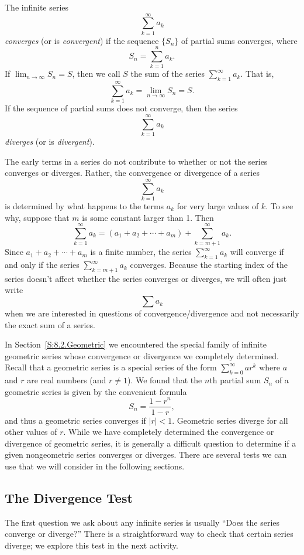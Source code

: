 \begin{definition} The infinite series
\[\sum_{k=1}^{\infty} a_k\]
\emph{converges} (or is \emph{convergent}) if the sequence $\{S_n\}$ of partial sums converges, where
\[S_n = \sum_{k=1}^n a_k.\]
If $\lim_{n \to \infty} S_n = S$, then we call $S$ the sum of the series $\sum_{k=1}^{\infty} a_k$.  That is,
\[\sum_{k=1}^{\infty} a_k = \lim_{n \to \infty} S_n = S.\]
If the sequence of partial sums does not converge, then the series
\[\sum_{k=1}^{\infty} a_k\]
\emph{diverges} (or is \emph{divergent}).
\end{definition}

The early terms in a series do not contribute to whether or not the series converges or diverges. Rather, the convergence or divergence of a series
\[\sum_{k=1}^{\infty} a_k\]
is determined by what happens to the terms $a_k$ for very large values of $k$. To see why, suppose that  $m$ is some constant larger than 1.  Then
\[\sum_{k=1}^{\infty} a_k = (a_1+a_2+ \cdots + a_m) + \sum_{k=m+1}^{\infty} a_k.\]
Since $a_1+a_2+ \cdots + a_m$ is a finite number, the series $\sum_{k=1}^{\infty} a_k$ will converge if and only if the series $\sum_{k=m+1}^{\infty} a_k$ converges. Because the starting index of the series doesn't affect whether the series converges or diverges, we will often just write
\[\sum a_k\]
when we are interested in questions of convergence/divergence and not necessarily the exact sum of a series.

In Section~\ref{S:8.2.Geometric} we encountered the special family of infinite geometric series whose convergence or divergence we completely determined. Recall that a geometric series is a special series of the form $\sum_{k=0}^{\infty} ar^k$ where $a$ and $r$ are real numbers (and $r \ne 1$). We found that the $n$th partial sum $S_n$ of a geometric series is given by the convenient formula 
$$S_n = \frac{1-r^{n}}{1-r},$$ 
and thus a geometric series converges if $|r| < 1$.  Geometric series diverge for all other values of $r$. While we have completely determined the convergence or divergence of geometric series, it is generally a difficult question to determine if a given nongeometric series converges or diverges. There are several tests we can use that we will consider in the following sections.

\subsection*{The Divergence Test}
The first question we ask about any infinite series is usually ``Does the series converge or diverge?''  There is a straightforward way to check that certain series diverge; we explore this test in the next activity.

